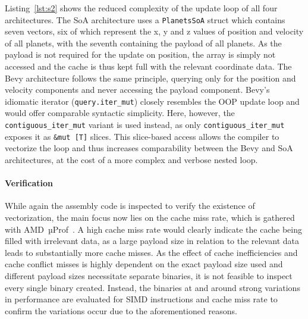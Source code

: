 Listing~\ref{lst:s2} shows the reduced complexity of the update loop of all four architectures. The \ac{SoA} architecture uses a \texttt{PlanetsSoA} struct which contains seven vectors, six of which represent the x, y and z values of position and velocity of all planets, with the seventh containing the payload of all planets. As the payload is not required for the update on position, the array is simply not accessed and the cache is thus kept full with the relevant coordinate data. The Bevy architecture follows the same principle, querying only for the position and velocity components and never accessing the payload component. Bevy's idiomatic iterator (\texttt{query.iter\_mut}) closely resembles the \ac{OOP} update loop and would offer comparable syntactic simplicity. Here, however, the \texttt{contiguous\_iter\_mut} variant is used instead, as only \texttt{contiguous\_iter\_mut} exposes it as \texttt{\&mut [T]} slices. This slice-based access allows the compiler to vectorize the loop and thus increases comparability between the Bevy and \ac{SoA} architectures, at the cost of a more complex and verbose nested loop.

\paragraph{Verification}
While again the assembly code is inspected to verify the existence of vectorization, the main focus now lies on the cache miss rate, which is gathered with AMD~µProf~\cite{amd_uprof}. A high cache miss rate would clearly indicate the cache being filled with irrelevant data, as a large payload size in relation to the relevant data leads to substantially more cache misses. As the effect of cache inefficiencies and cache conflict misses is highly dependent on the exact payload size used and different payload sizes necessitate separate binaries, it is not feasible to inspect every single binary created. Instead, the binaries at and around strong variations in performance are evaluated for \ac{SIMD} instructions and cache miss rate to confirm the variations occur due to the aforementioned reasons. 

